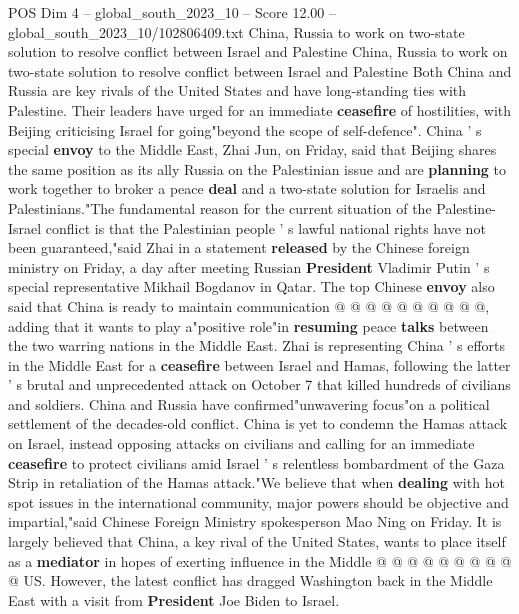 \begin{textsample}{POS Dim 4 – global\_south\_2023\_10 – Score 12.00 – global\_south\_2023\_10/102806409.txt}  \label{ex:f4_pos_424}
China, Russia to work on two-state solution to resolve conflict between Israel and Palestine China, Russia to work on two-state solution to resolve conflict between Israel and Palestine Both China and Russia are key rivals of the United States and have long-standing ties with Palestine.
Their leaders have urged for an immediate \textbf{ceasefire} of hostilities, with Beijing criticising Israel for going"beyond the scope of self-defence".
China ' s special \textbf{envoy} to the Middle East, Zhai Jun, on Friday, said that Beijing shares the same position as its ally Russia on the Palestinian issue and are \textbf{planning} to work together to broker a peace \textbf{deal} and a two-state solution for Israelis and Palestinians."The fundamental reason for the current situation of the Palestine-Israel conflict is that the Palestinian people ' s lawful national rights have not been guaranteed,"said Zhai in a statement \textbf{released} by the Chinese foreign ministry on Friday, a day after meeting Russian \textbf{President} Vladimir Putin ' s special representative Mikhail Bogdanov in Qatar.
The top Chinese \textbf{envoy} also said that China is ready to maintain communication @ @ @ @ @ @ @ @ @ @, adding that it wants to play a"positive role"in \textbf{resuming} peace \textbf{talks} between the two warring nations in the Middle East.
Zhai is representing China ' s efforts in the Middle East for a \textbf{ceasefire} between Israel and Hamas, following the latter ' s brutal and unprecedented attack on October 7 that killed hundreds of civilians and soldiers.
China and Russia have confirmed"unwavering focus"on a political settlement of the decades-old conflict.
China is yet to condemn the Hamas attack on Israel, instead opposing attacks on civilians and calling for an immediate \textbf{ceasefire} to protect civilians amid Israel ' s relentless bombardment of the Gaza Strip in retaliation of the Hamas attack."We believe that when \textbf{dealing} with hot spot issues in the international community, major powers should be objective and impartial,"said Chinese Foreign Ministry spokesperson Mao Ning on Friday.
It is largely believed that China, a key rival of the United States, wants to place itself as a \textbf{mediator} in hopes of exerting influence in the Middle @ @ @ @ @ @ @ @ @ @ US.
However, the latest conflict has dragged Washington back in the Middle East with a visit from \textbf{President} Joe Biden to Israel.

\end{textsample}
